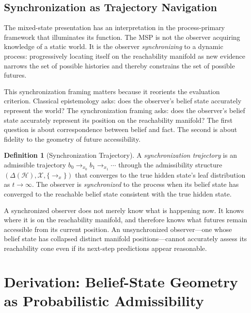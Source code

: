 \documentclass[12pt, a4paper]{article}
\theoremstyle{plain}
\theoremstyle{definition}
\newtheorem{definition}[theorem]{Definition}
\theoremstyle{remark}
\begin{document}
\subsection{Synchronization as Trajectory Navigation}

The mixed-state presentation has an interpretation in the process-primary
framework that illuminates its function. The MSP is not the observer
acquiring knowledge of a static world. It is the observer
\emph{synchronizing} to a dynamic process: progressively locating itself
on the reachability manifold as new evidence narrows the set of possible
histories and thereby constrains the set of possible futures.

This synchronization framing matters because it reorients the evaluation
criterion. Classical epistemology asks: does the observer's belief state
accurately represent the world? The synchronization framing asks: does
the observer's belief state accurately represent its position on the
reachability manifold? The first question is about correspondence between
belief and fact. The second is about fidelity to the geometry of future
accessibility.

\begin{definition}[Synchronization Trajectory]
A \emph{synchronization trajectory} is an admissible trajectory
$b_0 \to_{x_0} b_1 \to_{x_1} \cdots$ through the admissibility structure
$(\Delta(\mathcal{H}), \mathcal{X}, \{\to_x\})$ that converges to the
true hidden state's leaf distribution as $t \to \infty$. The observer
is \emph{synchronized} to the process when its belief state has converged
to the reachable belief state consistent with the true hidden state.
\end{definition}

A synchronized observer does not merely know what is happening now.
It knows where it is on the reachability manifold, and therefore knows
what futures remain accessible from its current position. An unsynchronized
observer---one whose belief state has collapsed distinct manifold
positions---cannot accurately assess its reachability cone even if its
next-step predictions appear reasonable.

\section{Derivation: Belief-State Geometry as Probabilistic Admissibility}
\label{sec:derivation}
\end{document}
